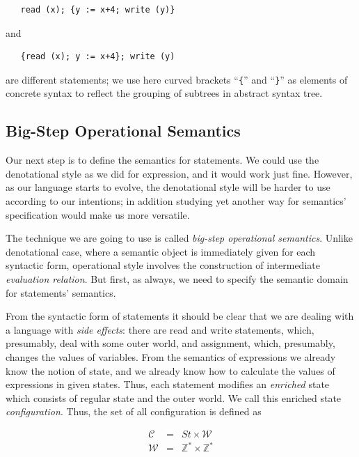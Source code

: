 \begin{lstlisting}
   read (x); {y := x+4; write (y)}
\end{lstlisting}

and

\begin{lstlisting}
   {read (x); y := x+4}; write (y)
\end{lstlisting}

are different statements; we use here curved brackets ``\lstinline|{|'' and ``\lstinline|}|'' as elements of concrete syntax to reflect the
grouping of subtrees in abstract syntax tree.

\subsection{Big-Step Operational Semantics}

Our next step is to define the semantics for statements. We could use the denotational style as we did for expression, and it would work
just fine. However, as our language starts to evolve, the denotational style will be harder to use according to our intentions; in addition
studying yet another way for semantics' specification would make us more versatile.

The technique we are going to use is called \emph{big-step operational semantics}. Unlike denotational case, where a semantic object
is immediately given for each syntactic form, operational style involves the construction of intermediate \emph{evaluation relation}.
But first, as always, we need to specify the semantic domain for statements' semantics.


From the syntactic form of statements it should be clear that we are dealing with a language with \emph{side effects}: there are read and
write statements, which, presumably, deal with some outer world, and assignment, which, presumably, changes the values of variables. From
the semantics of expressions we already know the notion of state, and we already know how to calculate the values of expressions in
given states. Thus, each statement modifies an \emph{enriched} state which consists of regular state and the outer world. We call this
enriched state \emph{configuration}. Thus, the set of all configuration is defined as

\[
\begin{array}{rcl}
  \mathscr C &=& St \times \mathscr W\\
  \mathscr W &=& \mathbb Z^* \times \mathbb Z^*
\end{array}
\]

